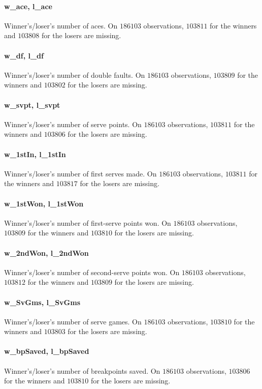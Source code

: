 \documentclass{article}
\begin{document}
\paragraph{w\_ace, l\_ace}
Winner's/loser's number of aces. On $186103$ observations, $103811$ for the winners and $103808$ for the losers are missing.

\paragraph{w\_df, l\_df}
Winner's/loser's number of double faults. On $186103$ observations, $103809$ for the winners and $103802$ for the losers are missing.

\paragraph{w\_svpt, l\_svpt}
Winner's/loser's number of serve points. On $186103$ observations, $103811$ for the winners and $103806$ for the losers are missing.

\paragraph{w\_1stIn, l\_1stIn}
Winner's/loser's number of first serves made. On $186103$ observations, $103811$ for the winners and $103817$ for the losers are missing.

\paragraph{w\_1stWon, l\_1stWon}
Winner's/loser's number of first-serve points won. On $186103$ observations, $103809$ for the winners and $103810$ for the losers are missing.

\paragraph{w\_2ndWon, l\_2ndWon}
Winner's/loser's number of second-serve points won. On $186103$ observations, $103812$ for the winners and $103809$ for the losers are missing.

\paragraph{w\_SvGms, l\_SvGms}
Winner's/loser's number of serve games. On $186103$ observations, $103810$ for the winners and $103803$ for the losers are missing.

\paragraph{w\_bpSaved, l\_bpSaved}
Winner's/loser's number of breakpoints saved. On $186103$ observations, $103806$ for the winners and $103810$ for the losers are missing.
\end{document}
